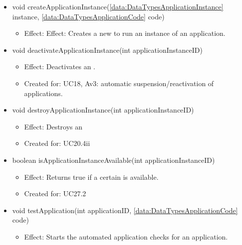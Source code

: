 \begin{description}
\begin{itemize}[noitemsep,nolistsep,leftmargin=-.25cm]
\begin{itemize}
        \end{itemize}
      \item \textsf{void createApplicationInstance(\ref{data:DataTypesApplicationInstance} instance, \ref{data:DataTypesApplicationCode} code)}
        \begin{itemize}[noitemsep,nolistsep]
           \item Effect: Effect: Creates a new  to run an instance of an application.
        \end{itemize}
      \item \textsf{void deactivateApplicationInstance(int applicationInstanceID)}
        \begin{itemize}[noitemsep,nolistsep]
           \item Effect: Deactivates an .
\item Created for: UC18, Av3: automatic suspension/reactivation of applications.
        \end{itemize}
      \item \textsf{void destroyApplicationInstance(int applicationInstanceID)}
        \begin{itemize}[noitemsep,nolistsep]
           \item Effect: Destroys an 
\item Created for: UC20.4ii
        \end{itemize}
      \item \textsf{boolean isApplicationInstanceAvailable(int applicationInstanceID)}
        \begin{itemize}[noitemsep,nolistsep]
           \item Effect: Returns true if a certain  is available.
\item Created for: UC27.2
        \end{itemize}
      \item \textsf{void testApplication(int applicationID, \ref{data:DataTypesApplicationCode} code)}
        \begin{itemize}[noitemsep,nolistsep]
           \item Effect: Starts the automated application checks for an application.

\end{itemize}
\end{itemize}
\end{description}
